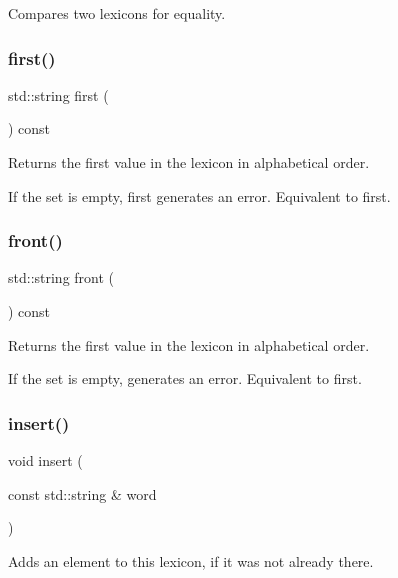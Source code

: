 Compares two lexicons for equality. 

\mbox{\label{classLexicon_aba89eab0637bde14f9ded33e9e9c6aa5}} 
\subsubsection{\texorpdfstring{first()}{first()}}
{\footnotesize\ttfamily std\+::string first (\begin{DoxyParamCaption}{ }\end{DoxyParamCaption}) const}



Returns the first value in the lexicon in alphabetical order. 

If the set is empty, {\ttfamily first} generates an error. Equivalent to first. \mbox{\label{classLexicon_a054217ec9f3229ceedee9d7bde075587}} 
\subsubsection{\texorpdfstring{front()}{front()}}
{\footnotesize\ttfamily std\+::string front (\begin{DoxyParamCaption}{ }\end{DoxyParamCaption}) const}



Returns the first value in the lexicon in alphabetical order. 

If the set is empty, generates an error. Equivalent to first. \mbox{\label{classLexicon_a1a017af6eb755b5c83e70f61e2bda2c7}} 
\subsubsection{\texorpdfstring{insert()}{insert()}}
{\footnotesize\ttfamily void insert (\begin{DoxyParamCaption}\item[{const std\+::string \&}]{word }\end{DoxyParamCaption})}



Adds an element to this lexicon, if it was not already there. 

